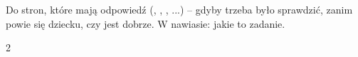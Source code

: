 \section*{\lblClave}

Do stron, które mają odpowiedź (\lblClasifica, \lblUne, \lblVF,
\lblTrueque...) -- gdyby trzeba było sprawdzić, zanim powie się dziecku,
czy jest dobrze. W nawiasie: jakie to zadanie.

\begin{multicols}{2}
\footnotesize
\begin{itemize}[leftmargin=0mm, label={}, itemsep=2mm, topsep=0mm]

\end{itemize}
\end{multicols}
\newpage

